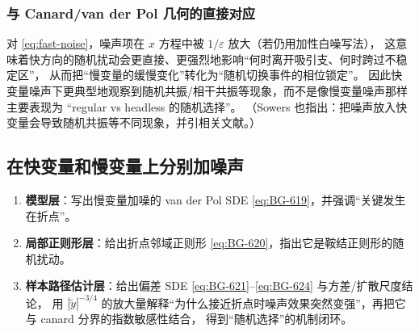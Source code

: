 \subsubsection{与 Canard/van der Pol 几何的直接对应}
对 \eqref{eq:fast-noise}，噪声项在 $x$ 方程中被 $1/\varepsilon$ 放大（若仍用加性白噪写法），
这意味着快方向的随机扰动会更直接、更强烈地影响“何时离开吸引支、何时跨过不稳定区”，
从而把“慢变量的缓慢变化”转化为“随机切换事件的相位锁定”。
因此快变量噪声下更典型地观察到随机共振/相干共振等现象，而不是像慢变量噪声那样主要表现为
“regular vs headless 的随机选择”。
（Sowers 也指出：把噪声放入快变量会导致随机共振等不同现象，并引相关文献。）%

\subsection{在快变量和慢变量上分别加噪声}


\begin{enumerate}
	\item \textbf{模型层}：写出慢变量加噪的 van der Pol SDE \eqref{eq:BG-619}，并强调“关键发生在折点”。%
	\item \textbf{局部正则形层}：给出折点邻域正则形 \eqref{eq:BG-620}，指出它是鞍结正则形的随机扰动。%
	\item \textbf{样本路径估计层}：给出偏差 SDE \eqref{eq:BG-621}--\eqref{eq:BG-624} 与方差/扩散尺度结论，
	用 $|\tilde y|^{-3/4}$ 的放大量解释“为什么接近折点时噪声效果突然变强”，再把它与 canard 分界的指数敏感性结合，
	得到“随机选择”的机制闭环。%
\end{enumerate}


